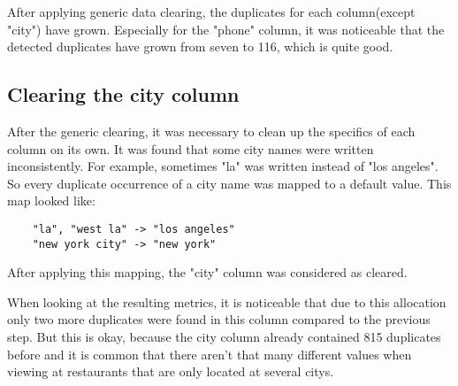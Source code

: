 \documentclass[conference]{IEEEtran}
\begin{document}
After applying generic data clearing, the duplicates for each column(except "city") have grown. Especially for the "phone" column, it was noticeable that the detected duplicates have grown from seven to 116, which is quite good.
\subsection{Clearing the city column}
After the generic clearing, it was necessary to clean up the specifics of each column on its own. It was found that some city names were written inconsistently. For example, sometimes "la" was written instead of "los angeles". So every duplicate occurrence of a city name was mapped to a default value. This map looked like: 
\begin{lstlisting}
	"la", "west la" -> "los angeles"
	"new york city" -> "new york"
\end{lstlisting}
After applying this mapping, the "city" column was considered as cleared.

When looking at the resulting metrics, it is noticeable that due to this allocation only two more duplicates were found in this column compared to the previous step. But this is okay, because the city column already contained 815 duplicates before and it is common that there aren't that many different values when viewing at restaurants that are only located at several citys.
\end{document}
